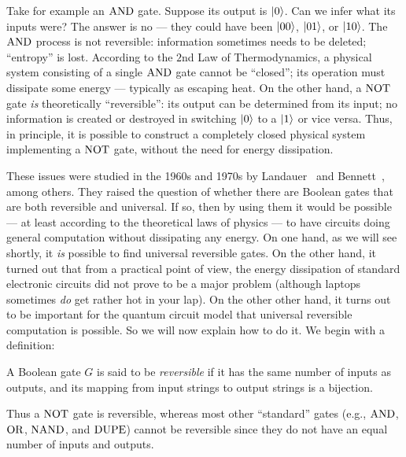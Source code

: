 \documentclass[12pt]{article}
\begin{document}
Take for example an $\AND$ gate.  Suppose its output is $\ket{0}$.  Can we infer what its inputs were?  The answer is no --- they could have been $\ket{00}$, $\ket{01}$, or $\ket{10}$.  The $\AND$ process is not reversible: information sometimes needs to be deleted; ``entropy'' is lost.  According to the $2$nd Law of Thermodynamics, a physical system consisting of a single $\AND$ gate cannot be ``closed''; its operation must dissipate some energy --- typically as escaping heat.  On the other hand, a $\NOT$ gate \emph{is} theoretically ``reversible'': its output can be determined from its input;  no information is created or destroyed in switching $\ket{0}$ to a $\ket{1}$ or vice versa.  Thus, in principle, it is possible to construct a completely closed physical system implementing a $\NOT$ gate, without the need for energy dissipation.

These issues were studied in the 1960s and 1970s by Landauer~\cite{Lan61} and Bennett~\cite{Ben73}, among others.  They raised the question of whether there are Boolean gates that are both reversible and universal.  If so, then by using them it would be possible --- at least according to the theoretical laws of physics --- to have circuits doing general computation without dissipating any energy.  On one hand, as we will see shortly, it \emph{is} possible to find universal reversible gates.  On the other hand, it turned out that from a practical point of view, the energy dissipation of standard electronic circuits did not prove to be a major problem (although laptops sometimes \emph{do} get rather hot in your lap).  On the other other hand, it turns out to be important for the quantum circuit model that universal reversible computation is possible.  So we will now explain how to do it. We begin with a definition:
\begin{definition}
    A Boolean gate $G$ is said to be \emph{reversible} if it has the same number of inputs as outputs, and its mapping from input strings to output strings is a bijection.
\end{definition}
Thus a $\NOT$ gate is reversible, whereas most other ``standard'' gates (e.g., $\AND$, $\OR$, $\NAND$, and $\DUPE$) cannot be reversible since they do not have an equal number of inputs and outputs.
\end{document}
